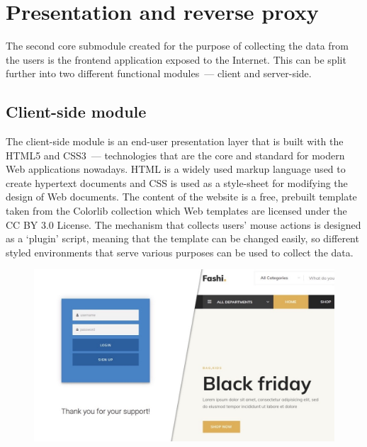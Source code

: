 \section{Presentation and reverse proxy}\label{sec:reverse-proxy}
The second core submodule created for the purpose of collecting the data from the users is the frontend application exposed to the Internet.
This can be split further into two different functional modules~--- client and server-side.

\subsection{Client-side module}\label{subsec:client-side-module}
The client-side module is an end-user presentation layer that is built with the HTML5 and CSS3~--- technologies that are the core and standard for modern Web applications nowadays.
HTML is a widely used markup language used to create hypertext documents and CSS is used as a style-sheet for modifying the design of Web documents.
The content of the website is a free, prebuilt template taken from the Colorlib collection which Web templates are licensed under the CC BY 3.0 License.
The mechanism that collects users' mouse actions is designed as a `plugin' script, meaning that the template can be changed easily, so different styled environments that serve various purposes can be used to collect the data.

\begin{figure}[hbt!]
    \centering
    \includegraphics[width=0.7\linewidth]{resources/frontpage.jpeg}
    \label{fig:frontpage}
\end{figure}

